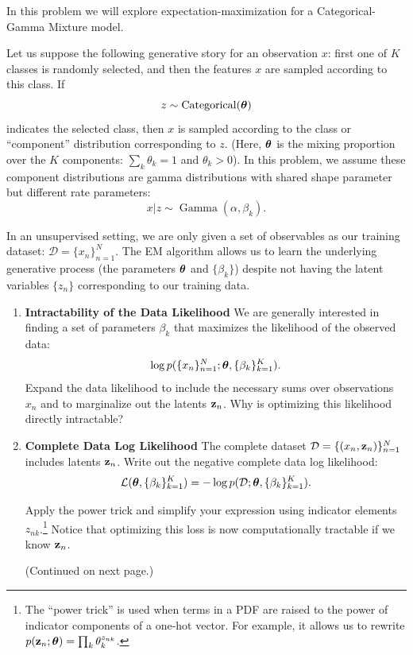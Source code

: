 \documentclass[submit]{harvardml}
\begin{document}
\newpage
\begin{problem}

In this problem we will explore expectation-maximization for a Categorical-Gamma Mixture model.

Let us suppose the following generative story for an observation $x$: first one of $K$ classes is randomly selected, and then the features $x$ are sampled according to this class. If $$z \sim \operatorname{Categorical}(\boldsymbol{\theta})$$ indicates the selected class, then $x$ is sampled according to the class or ``component'' distribution corresponding to $z$. (Here, $\boldsymbol{\theta}$ is the mixing proportion over the $K$ components: $\sum_k \theta_k = 1$ and $ \theta_k > 0$). In this problem, we assume these component distributions are gamma distributions with shared shape parameter but different rate parameters: $$x | z \sim \operatorname{Gamma}(\alpha, \beta_k).$$

In an unsupervised setting, we are only given a set of observables as our training dataset: $\mathcal D = \{x_n\}_{n=1}^N$. The EM algorithm allows us to learn the underlying generative process (the parameters $\boldsymbol{\theta}$ and $\{\beta_k\}$) despite not having the latent variables $\{z_n\}$ corresponding to our training data.

\vspace{2em}

\begin{enumerate}

  \item \textbf{Intractability of the Data Likelihood} We are
    generally interested in finding a set of parameters $\beta_k$ that
    maximizes the likelihood of the observed data: $$\log
    p(\{x_n\}^N_{n=1}; \boldsymbol{\theta}, \{\beta_k\}^K_{k = 1}).$$ Expand the data
    likelihood to include the necessary sums over observations
    $x_n$ and to marginalize out the latents
    $\mathbf{z}_n$. Why is optimizing this likelihood directly
    intractable?

\item \textbf{Complete Data Log Likelihood} The complete dataset
  $\mathcal D = \{(x_n, \mathbf{z}_n)\}_{n=1}^N$ includes latents $\mathbf{z}_n$. Write
  out the negative complete data log likelihood: $$\mathcal{L}(\boldsymbol{\theta}, \{\beta_k\}^K_{k=1}) =  -\log p(\mathcal D; \boldsymbol{\theta}, \{\beta_k\}^K_{k=1}).$$

  Apply the power trick and simplify your expression using indicator elements $z_{n
  k}$.\footnote{The ``power trick'' is used when terms in a PDF are raised to the power of indicator components of a one-hot vector.  For example, it allows us to rewrite $p(\mathbf{z}_n ;  \boldsymbol{\theta}) = \prod_k \theta_k^{z_{nk}}$.} Notice that optimizing this loss is now computationally tractable if we know $\mathbf{z}_n$.

  (Continued on next page.)

\end{enumerate}

\end{problem}
\end{document}
